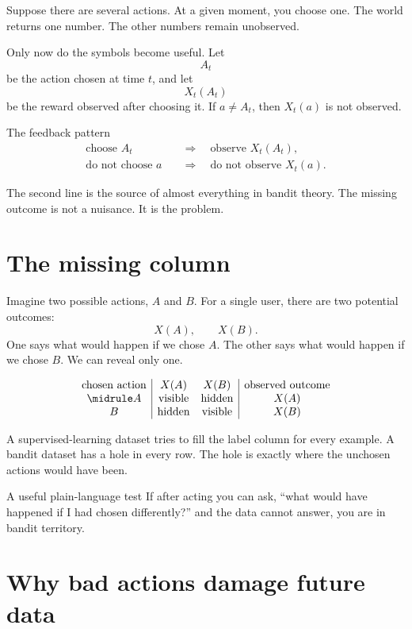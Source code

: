 \documentclass[en,nofont,11pt]{elegantbook}
\begin{document}
Suppose there are several actions. At a given moment, you choose one. The world returns one number. The other numbers remain unobserved.

Only now do the symbols become useful. Let
\[
A_t
\]
be the action chosen at time $t$, and let
\[
X_t(A_t)
\]
be the reward observed after choosing it. If $a\neq A_t$, then $X_t(a)$ is not observed.

\begin{derivationbox}{The feedback pattern}
\[
\begin{aligned}
\text{choose }A_t
&\quad\Longrightarrow\quad \text{observe }X_t(A_t),\\
\text{do not choose }a
&\quad\Longrightarrow\quad \text{do not observe }X_t(a).
\end{aligned}
\]
\end{derivationbox}

The second line is the source of almost everything in bandit theory. The missing outcome is not a nuisance. It is the problem.

\section{The missing column}

Imagine two possible actions, $A$ and $B$. For a single user, there are two potential outcomes:
\[
X(A),\qquad X(B).
\]
One says what would happen if we chose $A$. The other says what would happen if we chose $B$. We can reveal only one.

\[
\begin{array}{c|cc|c}
\text{chosen action} & X(A) & X(B) & \text{observed outcome}\\
\midrule
A & \text{visible} & \text{hidden} & X(A)\\
B & \text{hidden} & \text{visible} & X(B)
\end{array}
\]

A supervised-learning dataset tries to fill the label column for every example. A bandit dataset has a hole in every row. The hole is exactly where the unchosen actions would have been.

\begin{plainbox}{A useful plain-language test}
If after acting you can ask, ``what would have happened if I had chosen differently?'' and the data cannot answer, you are in bandit territory.
\end{plainbox}

\section{Why bad actions damage future data}
\end{document}
